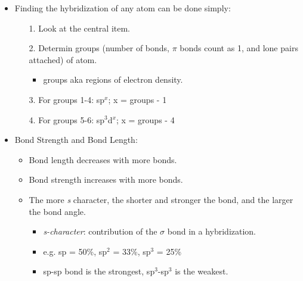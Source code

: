 \documentclass[12pt,a4paper]{article}
\begin{document}
\begin{itemize}
\begin{itemize}
\begin{itemize}
        \end{itemize}
    \item Finding the hybridization of any atom can be done simply: 
        \begin{itemize}
            \item[1.] Look at the central item.
            \item[2.] Determin groups (number of bonds, $\pi$ bonds count as 1, and lone pairs attached) of atom.
                    \begin{itemize}
                        \item groups aka regions of electron density.
                    \end{itemize}
            \item[3.] For groups 1-4: sp\(^{x}\); x = groups - 1  
            \item[4.] For groups 5-6: sp\(^{3}\)d\(^{x}\); x = groups - 4 
        \end{itemize}
    \item Bond Strength and Bond Length:
        \begin{itemize}
            \item Bond length {\color{neg}decreases} with more bonds.
            \item Bond strength {\color{pos}increases} with more bonds.
            \item The more {\color{o-Sun}\textit{s} character}, the {\color{pos}shorter} and {\color{pos}stronger} the bond, and the {\color{pos}larger} the bond angle.
                \begin{itemize}
                    \item \textit{s-character}: contribution of the $\sigma$ bond in a hybridization.
                    \item e.g. sp = 50\%, sp\(^{2}\) = 33\%, sp\(^{3}\) = 25\%
                    \item sp-sp bond is the strongest, sp\(^{3}\)-sp\(^{3}\) is the weakest.
                \end{itemize}
        \end{itemize}
\end{itemize}
\end{itemize}
\end{document}
